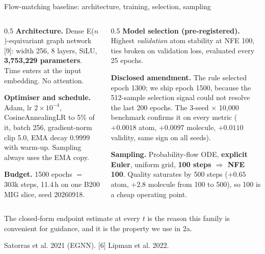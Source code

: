 \documentclass[aspectratio=169,10pt]{beamer}
\newcommand{\theslidelabel}{}
\newcommand{\lbl}[1]{\renewcommand{\theslidelabel}{#1}}
\newcommand{\srcs}[1]{\vfill{\raggedleft\color{grayt}\fontsize{4.9}{5.6}\selectfont #1\par}}
\newcommand{\take}[1]{\vspace{0.4ex}\colorbox{black!6}{\parbox{0.97\linewidth}{\footnotesize #1}}}
\begin{document}
\lbl{1c}
\begin{frame}[shrink=15]{Flow-matching baseline: architecture, training, selection, sampling}
  \begin{columns}[T]
  \begin{column}{0.5\textwidth}
    \textbf{Architecture.} Dense E($n$)-equivariant graph network [9]: width 256,
    8 layers, SiLU, \textbf{3{,}753{,}229 parameters}. Time enters at the input
    embedding. No attention.
    \smallskip

    \textbf{Optimiser and schedule.} Adam, lr $2\times10^{-4}$,
    CosineAnnealingLR to 5\% of it, batch 256, gradient-norm clip 5.0, EMA decay
    0.9999 with warm-up. Sampling always uses the EMA copy.
    \smallskip

    \textbf{Budget.} 1500 epochs $=$ 303k steps, 11.4\,h on one B200 MIG slice,
    seed 20260918.
  \end{column}
  \begin{column}{0.5\textwidth}
    \textbf{Model selection (pre-registered).} Highest \emph{validation} atom
    stability at NFE 100, ties broken on validation loss, evaluated every 25 epochs.
    \smallskip

    \textbf{Disclosed amendment.} The rule selected epoch 1300; we ship epoch 1500,
    because the 512-sample selection signal could not resolve the last 200 epochs.
    The 3-seed $\times$ 10{,}000 benchmark confirms it on every metric
    ($+0.0018$ atom, $+0.0097$ molecule, $+0.0110$ validity, same sign on all seeds).
    \smallskip

    \textbf{Sampling.} Probability-flow ODE, \textbf{explicit Euler}, uniform grid,
    \textbf{100 steps $\Rightarrow$ NFE 100}. Quality saturates by 500 steps
    ($+0.65$ atom, $+2.8$ molecule from 100 to 500), so 100 is a cheap operating
    point.
  \end{column}
  \end{columns}

  \take{The closed-form endpoint estimate at every $t$ is the reason this family is
  convenient for guidance, and it is the property we use in 2a.}

  \srcs{[9] Satorras et al. 2021 (EGNN). [6] Lipman et al. 2022.}
\end{frame}
\end{document}
